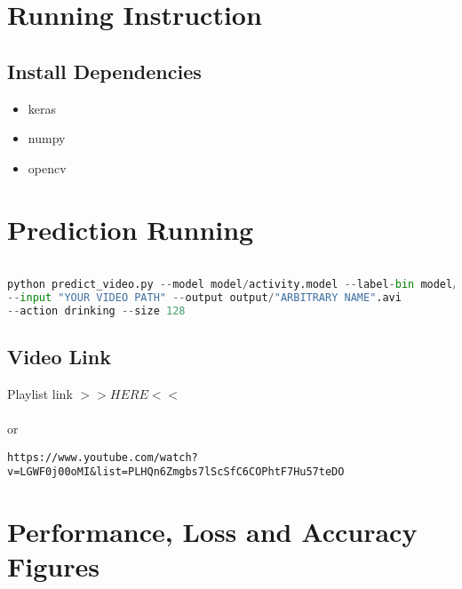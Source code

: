 \documentclass{article}
\begin{document}
\section{Running Instruction}
\subsection{Install Dependencies}
\begin{itemize}
    \item keras
    \item numpy
    \item opencv
\end{itemize}


\section{Prediction Running}

\begin{lstlisting}[language=python]

python predict_video.py --model model/activity.model --label-bin model/lb.pickle 
--input "YOUR VIDEO PATH" --output output/"ARBITRARY NAME".avi 
--action drinking --size 128

\end{lstlisting}

\subsection{Video Link}
Playlist link \textcolor{blue}{\href{https://www.youtube.com/watch?v=LGWF0j00oMI&list=PLHQn6Zmgbs7lScSfC6COPhtF7Hu57teDO}{$>>HERE<<$}}\\\\
or
\begin{verbatim}
https://www.youtube.com/watch?v=LGWF0j00oMI&list=PLHQn6Zmgbs7lScSfC6COPhtF7Hu57teDO
\end{verbatim}

\section{Performance, Loss and Accuracy Figures}


      
\end{document}
